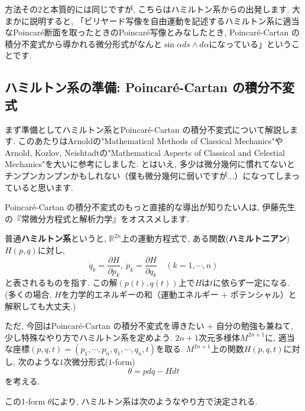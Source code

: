 \documentclass[a4paper]{ujarticle}
\numberwithin{equation}{section}
\theoremstyle{definition}
\begin{document}
    方法その2と本質的には同じですが, こちらはハミルトン系からの出発します.
    大まかに説明すると, 「ビリヤード写像を自由運動を記述するハミルトン系に適当なPoincar\'{e}断面を取ったときのPoincar\'{e}写像とみなしたとき, 
    Poincar\'{e}-Cartan の積分不変式から導かれる微分形式がなんと$\sin{\alpha} d s \wedge d \alpha$になっている」ということです.
    
    \subsection{ハミルトン系の準備: Poincar\'{e}-Cartan の積分不変式}
    まず準備としてハミルトン系とPoincar\'{e}-Cartan の積分不変式について解説します.
    このあたりはArnoldの"Mathematical Methods of Classical Mechanics"や
    Arnold, Kozlov, Neishtadtの"Mathematical Aspects of Classical and Celestial Mechanics"を大いに参考にしました.
    とはいえ, 多少は微分幾何に慣れてないとチンプンカンプンかもしれない（僕も微分幾何に弱いですが...）になってしまっていると思います. 

    Poincar\'{e}-Cartan の積分不変式のもっと直接的な導出が知りたい人は, 
    伊藤先生の『常微分方程式と解析力学』をオススメします.

    \vspace{\baselineskip}

    普通\textbf{ハミルトン系}というと, 
    $\mathbb{R}^{2n}$上の運動方程式で, ある関数(\textbf{ハミルトニアン})$H(p, q)$に対し, 
    \begin{equation} \label{ham}
        \dot{q}_{k} = \frac{\partial H}{\partial p_k}, \ \dot{p}_{k} = \frac{\partial H}{\partial q_k} \quad (k = 1, \cdots, n)
    \end{equation}
    と表されるものを指す.
    この解$(p(t), q(t))$上で$H$は$t$に依らず一定になる. 
    (多くの場合, $H$を力学的エネルギーの和（運動エネルギー + ポテンシャル）と解釈しても大丈夫.)

    ただ, 今回はPoincar\'{e}-Cartan の積分不変式を導きたい + 自分の勉強も兼ねて,
    少し特殊なやり方でハミルトン系を定めよう.
    \vspace{\baselineskip}
    $2n + 1$次元多様体$M^{2n + 1}$に, 適当な座標$(p, q, t) = (p_1, \cdots, p_n, q_1, \cdots, q_n, t)$を取る.
    $M^{2n + 1}$上の関数$H(p, q, t)$に対し, 
    次のような$1$次微分形式($1$-form)
    \begin{equation} \label{PC}
        \theta = p dq - H dt 
    \end{equation}
    を考える. 

    この1-form $\theta$により, ハミルトン系は次のようなやり方で決定される.
\end{document}
